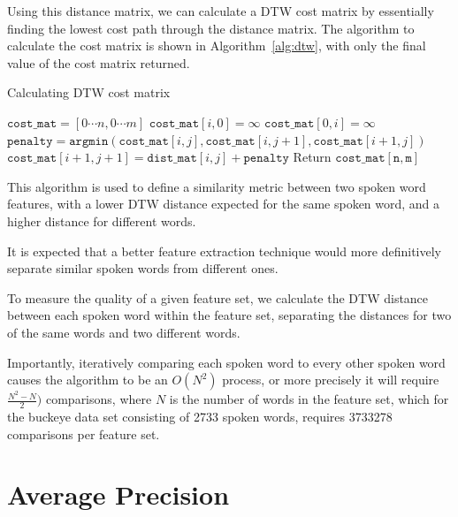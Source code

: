 Using this distance matrix, we can calculate a DTW cost matrix by essentially finding the lowest cost path through the distance matrix.
The algorithm to calculate the cost matrix is shown in Algorithm~\ref{alg:dtw}, with only the final value of the cost matrix returned.

\begin{algorithm}
    \caption{Calculating DTW cost matrix}
    \label{alg:dtw}
    \begin{algorithmic}
        \State $\mathtt{cost\_mat} = [0\cdots n, 0\cdots m]$
        \State $\mathtt{cost\_mat}[i, 0] = \infty$
        \EndFor
        \State $\mathtt{cost\_mat}[0, i] = \infty$
        \EndFor
        \State $\mathtt{penalty} = \mathtt{argmin}(\mathtt{cost\_mat}[i, j], \mathtt{cost\_mat}[i, j + 1], \mathtt{cost\_mat}[i+1, j])$
        \State $\mathtt{cost\_mat}[i+1, j+1] = \mathtt{dist\_mat}[i, j] + \mathtt{penalty}$
        \EndFor
        \EndFor
        \State Return $\mathtt{cost\_mat[n, m]}$
        \EndFunction
    \end{algorithmic}
\end{algorithm}

This algorithm is used to define a similarity metric between two spoken word features, with a lower DTW distance expected for the same spoken word, and a higher distance for different words.

It is expected that a better feature extraction technique would more definitively separate similar spoken words from different ones.

To measure the quality of a given feature set, we calculate the DTW distance between each spoken word within the feature set, separating the distances for two of the same words and two different words.\cite{kamper_elsner_jansen_goldwater_2015}

Importantly, iteratively comparing each spoken word to every other spoken word causes the algorithm to be an $O(N^2)$ process, or more precisely it will require $\frac{N^2-N}{2})$ comparisons, where $N$ is the number of words in the feature set, which for the buckeye data set consisting of 2733 spoken words, requires 3733278 comparisons per feature set.

\section{Average Precision}

